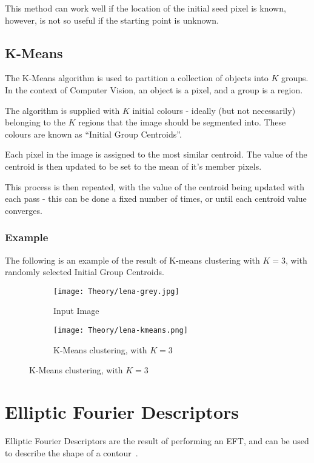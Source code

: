 This method can work well if the location of the initial seed pixel is known, however, is not so useful if the starting point is unknown.

\subsection{K-Means}
\label{sec:kmeans}
The K-Means algorithm is used to partition a collection of objects into $K$ groups. In the context of Computer Vision, an object is a pixel, and a group is a region.

The algorithm is supplied with $K$ initial colours - ideally (but not necessarily) belonging to the $K$ regions that the image should be segmented into. These colours are known as ``Initial Group Centroids''.

Each pixel in the image is assigned to the most similar centroid. The value of the centroid is then updated to be set to the mean of it's member pixels.

This process is then repeated, with the value of the centroid being updated with each pass - this can be done a fixed number of times, or until each centroid value converges.

\subsubsection{Example}
The following is an example of the result of K-means clustering with $K = 3$, with randomly selected Initial Group Centroids.

\begin{figure}[H]
    \centering
    \begin{subfigure}[b]{0.45\textwidth}
        \centering
        \texttt{[image: Theory/lena-grey.jpg]}
        \caption{Input Image}
    \end{subfigure}
    \begin{subfigure}[b]{0.45\textwidth}
        \centering
        \texttt{[image: Theory/lena-kmeans.png]}
        \caption{K-Means clustering, with $K = 3$}
    \end{subfigure}
\end{figure}

\section{Elliptic Fourier Descriptors}
\label{sec:eft}
Elliptic Fourier Descriptors are the result of performing an \ac{EFT}, and can be used to describe the shape of a contour~\cite{kuhl1982elliptic}.

